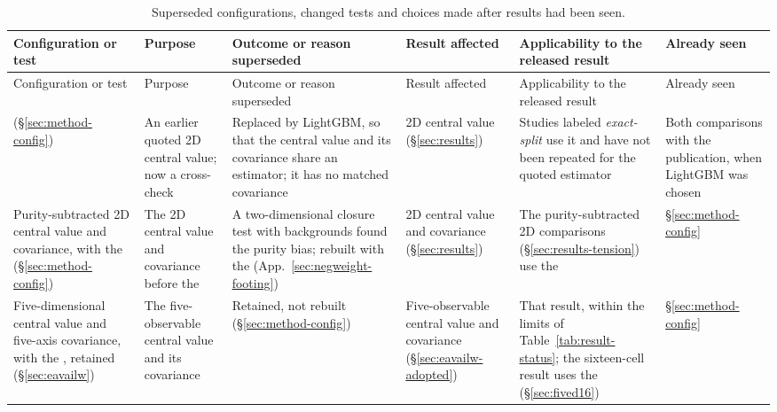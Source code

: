 {\setlength{\LTcapwidth}{\textwidth}
\begin{xltabular}{\textwidth}{@{}>{\footnotesize\RaggedRight\arraybackslash{}\hsize}X>{\footnotesize\RaggedRight\arraybackslash{}\hsize}X>{\footnotesize\RaggedRight\arraybackslash{}\hsize}X>{\footnotesize\RaggedRight\arraybackslash{}\hsize}X>{\footnotesize\RaggedRight\arraybackslash{}\hsize}X>{\footnotesize\RaggedRight\arraybackslash{}\hsize}X@{}}
\caption{Superseded configurations, changed tests and choices made after results had been seen.}
\label{tab:devhistory}\\
\toprule Configuration or test & Purpose & Outcome or reason superseded & Result affected & Applicability to the released result & Already seen \\
\midrule \endfirsthead \toprule Configuration or test & Purpose & Outcome or reason superseded & Result affected & Applicability to the released result & Already seen \\
\midrule \endhead \bottomrule \endlastfoot \EstExact{} (\S\ref{sec:method-config}) & An earlier quoted 2D central value; now a cross-check & Replaced by LightGBM, so that the central value and its covariance share an estimator; it has no matched covariance & 2D central value (\S\ref{sec:results}) & Studies labeled \emph{exact-split} use it and have not been repeated for the quoted estimator & Both comparisons with the publication, when LightGBM was chosen \\
\addlinespace Purity-subtracted 2D central value and covariance, with the \estPurity{} (\S\ref{sec:method-config}) & The 2D central value and covariance before the \estTwoD{} & A two-dimensional closure test with backgrounds found the purity bias; rebuilt with the \estTwoD{} (App.~\ref{sec:negweight-footing}) & 2D central value and covariance (\S\ref{sec:results}) & The purity-subtracted 2D comparisons (\S\ref{sec:results-tension}) use the \estPurity{} & \S\ref{sec:method-config} \\
\addlinespace Five-dimensional central value and five-axis covariance, with the \estPurity{}, retained (\S\ref{sec:eavailw}) & The five-observable central value and its covariance & Retained, not rebuilt (\S\ref{sec:method-config}) & Five-observable central value and covariance (\S\ref{sec:eavailw-adopted}) & That result, within the limits of Table~\ref{tab:result-status}; the sixteen-cell result uses the \estMultiD{} (\S\ref{sec:fived16}) & \S\ref{sec:method-config} \\

\end{xltabular}}
